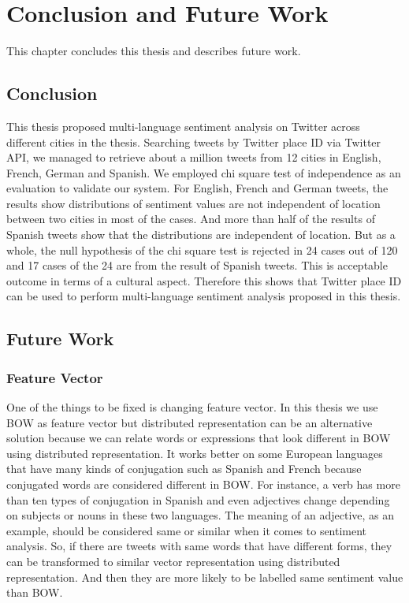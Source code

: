 \chapter{Conclusion and Future Work}
This chapter concludes this thesis and describes future work.
\section{Conclusion}
This thesis proposed multi-language sentiment analysis on Twitter across different cities in the thesis.
Searching tweets by Twitter place ID via Twitter API, we managed to retrieve about a million tweets from 12 cities in English, French, German and Spanish.
We employed chi square test of independence as an evaluation to validate our system.
For English, French and German tweets, the results show distributions of sentiment values are not independent of location between two cities in most of the cases.
And more than half of the results of Spanish tweets show that the distributions are independent of location. 
But as a whole, the null hypothesis of the chi square test is rejected in 24 cases out of 120 and 17 cases of the 24 are from the result of Spanish tweets.
This is acceptable outcome in terms of a cultural aspect.
Therefore this shows that Twitter place ID can be used to perform multi-language sentiment analysis proposed in this thesis.


\section{Future Work}
\subsection{Feature Vector}
One of the things to be fixed is changing feature vector.
In this thesis we use BOW as feature vector but distributed representation can be an alternative solution because we can relate words or expressions that look different in BOW using distributed representation.
It works better on some European languages that have many kinds of conjugation such as Spanish and French because conjugated words are considered different in BOW. 
For instance, a verb has more than ten types of conjugation in Spanish and even adjectives change depending on subjects or nouns in these two languages.
The meaning of an adjective, as an example, should be considered same or similar when it comes to sentiment analysis.
So, if there are tweets with same words that have different forms, they can be transformed to similar vector representation using distributed representation.
And then they are more likely to be labelled same sentiment value than BOW.

